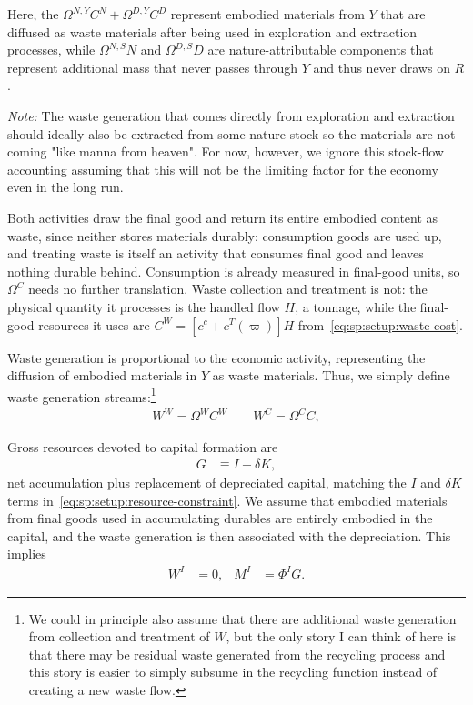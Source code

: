Here, the $\Omega^{N,Y}C^N+\Omega^{D,Y}C^D$ represent embodied materials from $Y$ that are diffused as waste materials after being used in exploration and extraction processes, while $\Omega^{N,S} N $ and $\Omega^{D,S} D$ are nature-attributable components that represent additional mass that never passes through $Y$ and thus never draws on $R$. 

\textit{Note:} The waste generation that comes directly from exploration and extraction should ideally also be extracted from some nature stock so the materials are not coming "like manna from heaven". For now, however, we ignore this stock-flow accounting assuming that this will not be the limiting factor for the economy even in the long run.




 Both activities draw the final good and return its entire embodied content as waste, since neither stores materials durably: consumption goods are used up, and treating waste is itself an activity that consumes final good and leaves nothing durable behind. Consumption is already measured in final-good units, so $\Omega^C$ needs no further translation. Waste collection and treatment is not: the physical quantity it processes is the handled flow $H$, a tonnage, while the final-good resources it uses are $C^W=\left[c^c+c^T(\varpi)\right]H$ from~\eqref{eq:sp:setup:waste-cost}. 


Waste generation is proportional to the economic activity, representing the diffusion of embodied materials in $Y$ as waste materials. Thus, we simply define waste generation streams:\footnote{We could in principle also assume that there are additional waste generation from collection and treatment of $W$, but the only story I can think of here is that there may be residual waste generated from the recycling process and this story is easier to simply subsume in the recycling function instead of creating a new waste flow.}
\begin{align}
    W^W = \Omega^{W} C^W \qquad W^C= \Omega^C C, \label{eq:sp:setup:wc}
\end{align}


 Gross resources devoted to capital formation are
\begin{align}
G &\equiv I+\delta K,
\label{eq:sp:setup:gross-formation}
\end{align}
net accumulation plus replacement of depreciated capital, matching the $I$ and $\delta K$ terms in~\eqref{eq:sp:setup:resource-constraint}. We assume that embodied materials from final goods used in accumulating durables are entirely embodied in the capital, and the waste generation is then associated with the depreciation. This implies
\begin{align}
    W^I &= 0, & M^I &= \Phi^IG.
\label{eq:sp:setup:investment}
\end{align}


